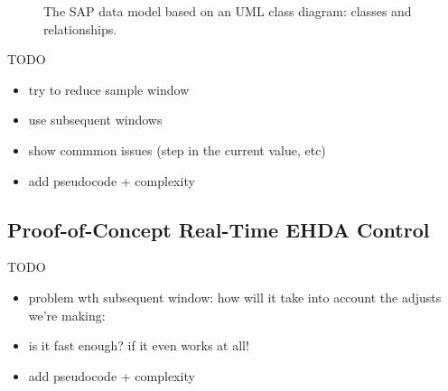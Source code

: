 \documentclass[oneside,12pt]{article}
\begin{document}
\begin{landscape}
    \begin{figure}[tb] 
        \centering
        \caption{The SAP data model based on an UML class diagram: classes and relationships.}
        \label{fig:Fig5}
    \end{figure}
\end{landscape}



TODO
\begin{itemize}
    \item try to reduce sample window
    \item use subsequent windows
    \item show commmon issues (step in the current value, etc)
    \item add pseudocode + complexity
\end{itemize}

\subsection{Proof-of-Concept Real-Time EHDA Control}
TODO

\begin{itemize}
    \item problem wth subsequent window: how will it take into account the adjusts we're making:
    \item is it fast enough? if it even works at all!
    \item add pseudocode + complexity
\end{itemize}

\newpage    \pagestyle{plain}

\end{document}
